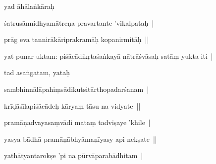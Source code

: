 \documentclass[article,12pt,a4paper]{memoir}%
\newcounter{parCount}
\begin{document}
	  
	  \pstart \leavevmode%
	yad āhālaṅkāraḥ 
	{}
	\pend%
      

	  
	  \pstart \leavevmode%
	śatrusānnidhyamātreṇa pravartante 'vikalpataḥ | 
	{}
	\pend%
      

	  
	  \pstart \leavevmode%
	prāg eva tannirākāriprakramāḥ kopanirmitāḥ || 
	{}
	\pend%
      

	  
	  \pstart \leavevmode%
	yat punar uktam: piśācādikṛtaśaṅkayā nātrāśvāsaḥ satāṃ yukta iti | 
	{}
	\pend%
      

	  
	  \pstart \leavevmode%
	tad asaṅgatam, yataḥ 
	{}
	\pend%
      

	  
	  \pstart \leavevmode%
	sambhinnālāpahiṃsādikutsitārthopadarśanam | 
	{}
	\pend%
      

	  
	  \pstart \leavevmode%
	krīḍāśīlapiśācādeḥ kāryaṃ tāsu na vidyate || 
	{}
	\pend%
      

	  
	  \pstart \leavevmode%
	pramāṇadvayasaṃvādi mataṃ tadviṣaye 'khile | 
	{}
	\pend%
      

	  
	  \pstart \leavevmode%
	yasya bādhā pramāṇābhyāmaṇīyasy api nekṣate || 
	{}
	\pend%
      

	  
	  \pstart \leavevmode%
	yathātyantarokṣe 'pi na pūrvāparabādhitam | 
	{}
	\pend%
      
\end{document}
